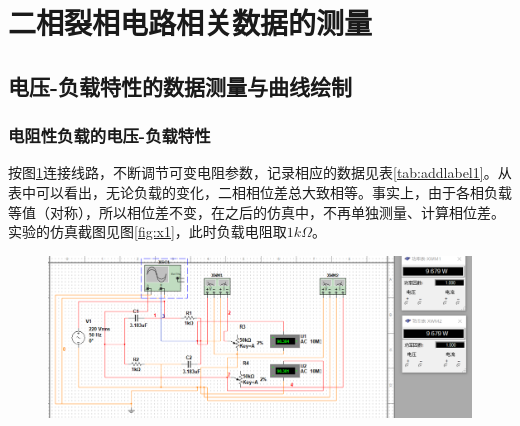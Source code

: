 \documentclass[12pt]{article}%
\begin{document}
\section{二相裂相电路相关数据的测量}
\subsection{电压-负载特性的数据测量与曲线绘制}
\subsubsection{电阻性负载的电压-负载特性}
按图\ref{fig:a1}连接线路，不断调节可变电阻参数，记录相应的数据见表\ref{tab:addlabel1}。从表中可以看出，无论负载的变化，二相相位差总大致相等。事实上，由于各相负载等值（对称），所以相位差不变，在之后的仿真中，不再单独测量、计算相位差。实验的仿真截图见图\ref{fig:x1}，此时负载电阻取$1k\Omega$。
\begin{figure}[htbp]
\centering\includegraphics[width=\linewidth]{TIM20180531171555.png}
\caption{\heiti{}}\label{fig:a1}
\end{figure}
\end{document}
